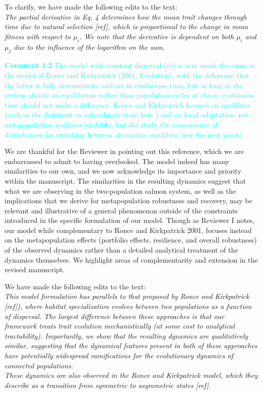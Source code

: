 \documentclass[ucm,12pt]{ucletter}
\begin{document}
\begin{letter}
\noindent To clarify, we have made the following edits to the text:\\
 \emph{The partial derivative in Eq. 4 determines how the mean trait changes through time due to natural selection [ref], which is proportional to the change in mean fitness with respect to $\mu_i$.
We note that the derivative is dependent on both $\mu_i$ and $\mu_j$ due to the influence of the logarithm on the sum.}

\noindent \textcolor{cyan}{
{\bf Comment 1.2} The model with constant dispersal ($m$) is very much the same as the model of Ronce and Kirkpatrick (2001, Evolution), with the difference that the latter is fully deterministic and set in continuous time; but as long as the system attains an equilibrium rather than population cycles or chaos, continuous time should not make a difference. Ronce and Kirkpatrick focused on equilibria (such as the dominant vs subordinate state here ) and on local adaptation, not metapopulation resilience/stability, but did study the consequence of disturbances for switching between alternative equilibria (see the next point).
}

 We are thankful for the Reviewer in pointing out this reference, which we are embarrassed to admit to having overlooked. The model indeed has many similarities to our own, and we now acknowledge its importance and priority within the manuscript. The similarities in the resulting dynamics suggest that what we are observing in the two-population salmon system, as well as the implications that we derive for metapopulation robustness and recovery, may be  relevant and illustrative of a general phenomenon outside of the constraints introduced in the specific formulation of our model. Though as Reviewer I notes, our model while complementary to Ronce and Kirkpatrick 2001, focuses instead on the metapopulation effects (portfolio effects, resilience, and overall robustness) of the observed dynamics rather than a detailed analytical treatment of the dynamics themselves. We highlight areas of complementarity and extension in the revised manuscript.

\noindent We have made the following edits to the text:\\
 \emph{This model formulation has parallels to that proposed by Ronce and Kirkpatrick [ref]), where habitat specialization evolves between two populations as a function of dispersal.
The largest difference between these approaches is that our framework treats trait evolution mechanistically (at some cost to analytical tractability).
Importantly, we show that the resulting dynamics are qualitatively similar, suggesting that the dynamical features present in both of these approaches have potentially widespread ramifications for the evolutionary dynamics of connected populations.}\\
 \emph{These dynamics are also observed in the Ronce and Kirkpatrick model, which they describe as a transition from symmetric to asymmetric states [ref].}



\end{letter}
\end{document}
